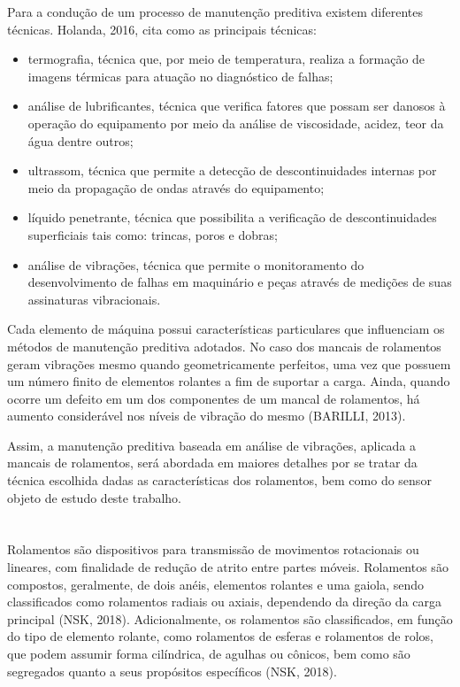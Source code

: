 \documentclass[
	12pt,				
	oneside,			
	a4paper,			
	english,			
	brazil,	
	sumario=abnt-6027-2012		
	]{abntex2ppgsi}
\begin{document}
Para a condução de um processo de manutenção preditiva existem diferentes técnicas. Holanda, 2016, cita como as principais técnicas: 
\begin{itemize}
	\item termografia, técnica que, por meio de temperatura, realiza a formação de imagens térmicas para atuação no diagnóstico de falhas; 
	\item análise de lubrificantes, técnica que verifica fatores que possam ser danosos à operação do equipamento por meio da análise de viscosidade, acidez, teor da água dentre outros; 
	\item ultrassom, técnica que permite a detecção de descontinuidades internas por meio da propagação de ondas através do equipamento; 
	\item líquido penetrante, técnica que possibilita a verificação de descontinuidades superficiais tais como: trincas, poros e dobras; 
	\item análise de vibrações, técnica que permite o monitoramento do desenvolvimento de falhas em maquinário e peças através de medições de suas assinaturas vibracionais. 
\end{itemize}

Cada elemento de máquina possui características particulares que influenciam os métodos de manutenção preditiva adotados. No caso dos mancais de rolamentos geram vibrações mesmo quando geometricamente perfeitos, uma vez que possuem um número finito de elementos rolantes a fim de suportar a carga. Ainda, quando ocorre um defeito em um dos componentes de um mancal de rolamentos, há aumento considerável nos níveis de vibração do mesmo (BARILLI, 2013).

Assim, a manutenção preditiva baseada em análise de vibrações, aplicada a mancais de rolamentos, será abordada em maiores detalhes por se tratar da técnica escolhida dadas as características dos rolamentos, bem como do sensor objeto de estudo deste trabalho.



\newpage
\section{}
Rolamentos são dispositivos para transmissão de movimentos rotacionais ou lineares, com finalidade de redução de atrito entre partes móveis. Rolamentos são compostos, geralmente, de dois anéis, elementos rolantes e uma gaiola, sendo classificados como rolamentos radiais ou axiais, dependendo da direção da carga principal (NSK, 2018). Adicionalmente, os rolamentos são classificados, em função do tipo de elemento rolante, como rolamentos de esferas e rolamentos de rolos, que podem assumir forma cilíndrica, de agulhas ou cônicos, bem como são segregados quanto a seus propósitos específicos (NSK, 2018).
\end{document}
